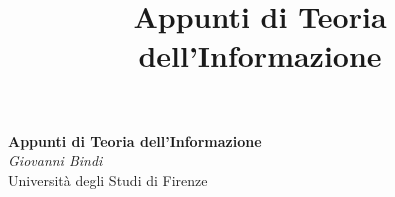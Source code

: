 \documentclass[11pt]{article}
\theoremstyle{definition}
\numberwithin{equation}{subsection}
\begin{document}
\setcounter{section}{0}
\title{Appunti di Teoria dell'Informazione}

\thispagestyle{empty}

\begin{center}
{\LARGE \bf Appunti di Teoria dell'Informazione}\\
{\large \textit{Giovanni Bindi}} \\
{Universit\`a degli Studi di Firenze}
\end{center}

\tableofcontents

\newpage


\newpage


\newpage


\newpage


\newpage


\newpage
\begin{appendices}

\end{appendices}
\end{document}
